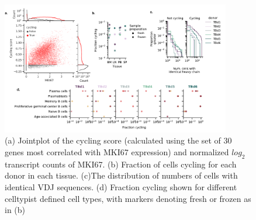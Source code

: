 \begin{figure}
    \centering
    \includegraphics[width=10cm, keepaspectratio]{figs/Tabula_Bursa/EDFigure1.pdf}
    \caption[Cell cycle analysis across tissues.] {(a) Jointplot of the cycling score (calculated using the set of 30 genes most correlated with MKI67 expression) and normalized $log_2$ transcript counts of MKI67. (b) Fraction of cells cycling for each donor in each tissue. (c)The distribution of numbers of cells with identical VDJ sequences. (d) Fraction cycling shown for different celltypist defined cell types, with markers denoting fresh or frozen as in (b) }
\label{ED:cycling}
\end{figure}